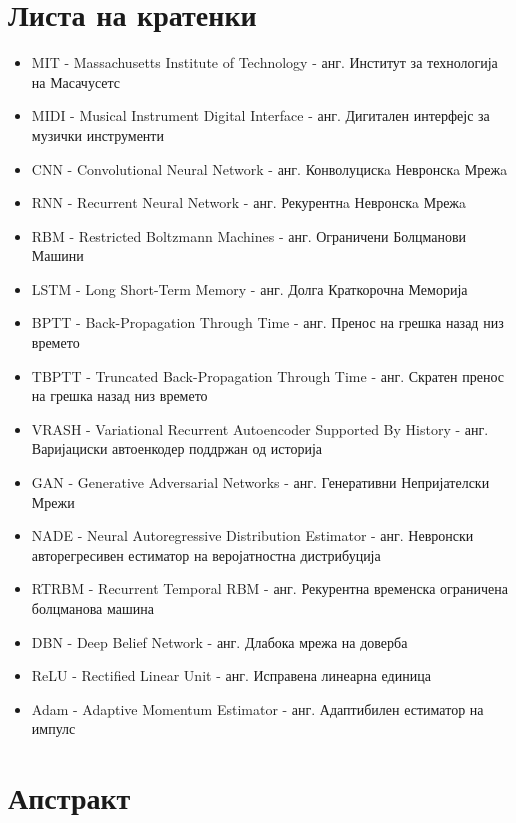 \chapter*{Листа на кратенки}

\begin{itemize}
    \item MIT - Massachusetts Institute of Technology - анг. Институт за технологија на Масачусетс
    \item MIDI - Musical Instrument Digital Interface - анг. Дигитален интерфејс за музички инструменти
    \item CNN - Convolutional Neural Network - анг. Конволуцискa Невронскa Мрежa
    \item RNN - Recurrent Neural Network - анг. Рекурентнa Невронскa Мрежa
    \item RBM - Restricted Boltzmann Machines - анг. Ограничени Болцманови Машини
    \item LSTM - Long Short-Term Memory - анг. Долга Краткорочна Меморија
    \item BPTT - Back-Propagation Through Time - анг. Пренос на грешка назад низ времето
    \item TBPTT - Truncated Back-Propagation Through Time - анг. Скратен пренос на грешка назад низ времето
    \item VRASH - Variational Recurrent Autoencoder Supported By History - анг. Варијациски автоенкодер поддржан од историја
    \item GAN - Generative Adversarial Networks - анг. Генеративни Непријателски Мрежи
    \item NADE - Neural Autoregressive Distribution Estimator - анг. Невронски авторегресивен естиматор на веројатностна дистрибуција
    \item RTRBM - Recurrent Temporal RBM - анг. Рекурентна временска ограничена болцманова машина
    \item DBN - Deep Belief Network - анг. Длабока мрежа на доверба
    \item ReLU - Rectified Linear Unit - анг. Исправена линеарна единица 
    \item Adam - Adaptive Momentum Estimator - анг. Адаптибилен естиматор на импулс
\end{itemize}

\newpage

\chapter*{Апстракт}

